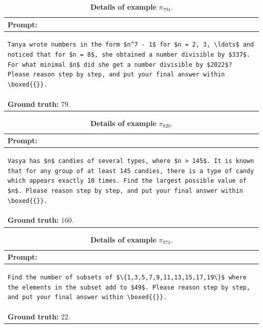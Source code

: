 \begin{table}[htbp]
\centering
\caption{\textbf{Details of example} $\pi_{794}$.}
\begin{tabular}{p{}}
\toprule
\textbf{Prompt:} \\
\midrule
\footnotesize
\begin{lstlisting}[breaklines=true, basicstyle=\ttfamily, aboveskip=-1.0em, belowskip=0pt, breakindent=0pt]
Tanya wrote numbers in the form $n^7 - 1$ for $n = 2, 3, \ldots$ and noticed that for $n = 8$, she obtained a number divisible by $337$. For what minimal $n$ did she get a number divisible by $2022$? Please reason step by step, and put your final answer within \boxed{{}}.
\end{lstlisting} \\
\midrule
\textbf{Ground truth:} $79$. \\
\bottomrule
\end{tabular}
\end{table}


\begin{table}[htbp]
\centering
\caption{\textbf{Details of example} $\pi_{820}$.}
\begin{tabular}{p{}}
\toprule
\textbf{Prompt:} \\
\midrule
\footnotesize
\begin{lstlisting}[breaklines=true, basicstyle=\ttfamily, aboveskip=-1.0em, belowskip=0pt, breakindent=0pt]
Vasya has $n$ candies of several types, where $n > 145$. It is known that for any group of at least 145 candies, there is a type of candy which appears exactly 10 times. Find the largest possible value of $n$. Please reason step by step, and put your final answer within \boxed{{}}.
\end{lstlisting} \\
\midrule
\textbf{Ground truth:} $160$. \\
\bottomrule
\end{tabular}
\end{table}


\begin{table}[htbp]
\centering
\caption{\textbf{Details of example} $\pi_{874}$.}
\begin{tabular}{p{}}
\toprule
\textbf{Prompt:} \\
\midrule
\footnotesize
\begin{lstlisting}[breaklines=true, basicstyle=\ttfamily, aboveskip=-1.0em, belowskip=0pt, breakindent=0pt]
Find the number of subsets of $\{1,3,5,7,9,11,13,15,17,19\}$ where the elements in the subset add to $49$. Please reason step by step, and put your final answer within \boxed{{}}.
\end{lstlisting} \\
\midrule
\textbf{Ground truth:} $22$. \\
\bottomrule
\end{tabular}
\end{table}


